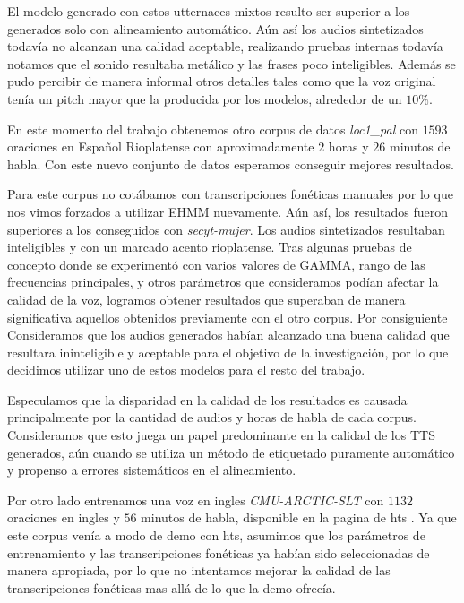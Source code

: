 El modelo generado con estos utternaces mixtos resulto ser superior a los generados solo con alineamiento automático. Aún así los audios sintetizados todavía no alcanzan una calidad aceptable, realizando pruebas internas todavía notamos que el sonido resultaba metálico y las frases poco inteligibles. Además se pudo percibir de manera informal otros detalles tales como que la voz original tenía un pitch mayor que la producida por los modelos, alrededor de un $10\%$.

En este momento del trabajo obtenemos otro corpus de datos \textit{loc1\_pal}\cite{loc1pal} con $1593$ oraciones en Español Rioplatense con aproximadamente $2$ horas y $26$ minutos de habla. Con este nuevo conjunto de datos esperamos conseguir mejores resultados.

Para este corpus no cotábamos con transcripciones fonéticas manuales por lo que nos vimos forzados a utilizar EHMM nuevamente. Aún así, los resultados fueron superiores a los conseguidos con \textit{secyt-mujer}. Los audios sintetizados resultaban inteligibles y con un marcado acento rioplatense. Tras algunas pruebas de concepto donde se experimentó con varios valores de GAMMA, rango de las frecuencias principales, y otros parámetros que consideramos podían afectar la calidad de la voz, logramos obtener resultados que superaban de manera significativa aquellos obtenidos previamente con el otro corpus. Por consiguiente Consideramos que los audios generados habían alcanzado una buena calidad que resultara ininteligible y aceptable para el objetivo de la investigación, por lo que decidimos utilizar uno de estos modelos para el resto del trabajo.


Especulamos que la disparidad en la calidad de los resultados es causada principalmente por la cantidad de audios y horas de habla de cada corpus\cite{whyItSucked}. Consideramos que esto juega un papel predominante en la calidad de los TTS generados, aún cuando se utiliza un método de etiquetado puramente automático y propenso a errores sistemáticos en el alineamiento.

Por otro lado entrenamos una voz en ingles \textit{CMU-ARCTIC-SLT}\cite{cmuArtic} con $1132$ oraciones en ingles y $56$ minutos de habla, disponible en la pagina de hts \cite{hts}. Ya que este corpus venía a modo de demo con hts, asumimos que los parámetros de entrenamiento y las transcripciones fonéticas ya habían sido seleccionadas de manera apropiada, por lo que no intentamos mejorar la calidad de las transcripciones fonéticas mas allá de lo que la demo ofrecía.

